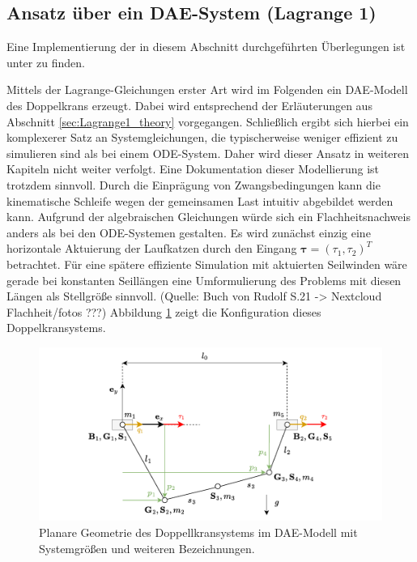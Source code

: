 \subsection{Ansatz über ein DAE-System (Lagrange 1)}
Eine Implementierung der in diesem Abschnitt durchgeführten Überlegungen ist unter \cite[double\_crane\_notebooks/DAE\_double\_crane\_cartesian.ipynb]{SAGithub} zu finden.

Mittels der Lagrange-Gleichungen erster Art wird im Folgenden ein DAE-Modell des Doppelkrans erzeugt. Dabei wird entsprechend der Erläuterungen aus Abschnitt \ref{sec:Lagrange1_theory} vorgegangen. Schließlich ergibt sich hierbei ein komplexerer Satz an Systemgleichungen, die typischerweise weniger effizient zu simulieren sind als bei einem ODE-System. Daher wird dieser Ansatz in weiteren Kapiteln nicht weiter verfolgt. Eine Dokumentation dieser Modellierung ist trotzdem sinnvoll. Durch die Einprägung von Zwangsbedingungen kann die kinematische Schleife wegen der gemeinsamen Last intuitiv abgebildet werden kann. Aufgrund der algebraischen Gleichungen würde sich ein Flachheitsnachweis anders als bei den ODE-Systemen gestalten. Es wird zunächst einzig eine horizontale Aktuierung der Laufkatzen durch den Eingang $\boldsymbol{\tau} = (\tau_{1}, \tau_{2})^T$ betrachtet. Für eine spätere effiziente Simulation mit aktuierten Seilwinden wäre gerade bei konstanten Seillängen eine Umformulierung des Problems mit diesen Längen als Stellgröße sinnvoll. (Quelle: Buch von Rudolf S.21 -> Nextcloud Flachheit/fotos ???) Abbildung \ref{fig:DAE_double_crane_diagram} zeigt die Konfiguration dieses Doppelkransystems.

\begin{figure}[ht]
	\begin{center}
		\includegraphics[scale=1]{Pictures/DAE_double_crane_cartesian_diagram.pdf}
	\end{center}
	\caption[Planare Geometrie des Doppellkransystems im DAE-Modell]
	{Planare Geometrie des Doppellkransystems im DAE-Modell mit Systemgrößen und weiteren Bezeichnungen.}
	\label{fig:DAE_double_crane_diagram}
\end{figure}

